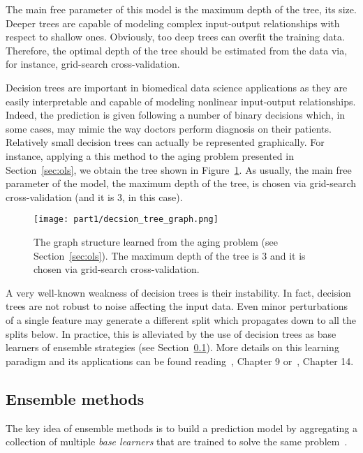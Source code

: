 		The main free parameter of this model is the maximum depth of the tree, \ie its size. Deeper trees are capable of modeling complex input-output relationships with respect to shallow ones. Obviously, too deep trees can overfit the training data. Therefore, the optimal depth of the tree should be estimated from the data via, for instance, grid-search cross-validation.
				
		Decision trees are important in biomedical data science applications as they are easily interpretable and capable of modeling nonlinear input-output relationships. Indeed, the prediction is given following a number of binary decisions which, in some cases, may mimic the way doctors perform diagnosis on their patients. Relatively small decision trees can actually be represented graphically. For instance, applying a this method to the aging problem presented in Section~\ref{sec:ols}, we obtain the tree shown in Figure~\ref{fig:tree_graph}. As usually, the main free parameter of the model, \ie the maximum depth of the tree,  is chosen via grid-search cross-validation (and it is $3$, in this case).
		
		\begin{figure}[!hb]
			\centering
			\texttt{[image: part1/decsion\_tree\_graph.png]}
			\caption{The graph structure learned from the aging problem (see Section~\ref{sec:ols}). The maximum depth of the tree is $3$ and it is chosen via grid-search cross-validation.} \label{fig:tree_graph}
		\end{figure}
	
		A very well-known weakness of decision trees is their instability. In fact, decision trees are not robust to noise affecting the input data. Even minor perturbations of a single feature may generate a different split which propagates down to all the splits below. In practice, this is alleviated by the use of decision trees as base learners of ensemble strategies (see Section~\ref{sec:ensemble_methods}).
		More details on this learning paradigm and its applications can be found reading~\cite{hastie2009elements}, Chapter 9 or~\cite{bishop2006pattern}, Chapter 14.

	    \subsection{Ensemble methods} \label{sec:ensemble_methods}
	    The key idea of ensemble methods is to build a prediction model by aggregating a collection of multiple \textit{base learners} that are trained to solve the same problem~\citep{zhou2012ensemble}.

